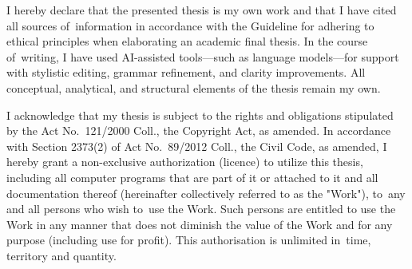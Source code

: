 \documentclass[english,bachelor,twoside]{ctufit-thesis} %
\begin{document}
\cleardoublepage
\begin{declarationpage}
I hereby declare that the presented thesis is my own work and that I have cited all sources of~information in accordance with the Guideline for adhering to ethical principles when elaborating an academic final thesis. 
In the course of~writing, I have used AI-assisted tools—such as language models—for support with stylistic editing, grammar refinement, and clarity improvements. All conceptual, analytical, and structural elements of the thesis remain my own.

I acknowledge that my thesis is subject to the rights and obligations stipulated by the Act No.~121/2000 Coll., the Copyright Act, as amended. In accordance with Section 2373(2) of Act No.~89/2012 Coll., the Civil Code, as amended, I hereby grant a non-exclusive authorization (licence) to utilize this thesis, including all computer programs that are part of it or attached to it and all documentation thereof (hereinafter collectively referred to as the "Work"), to~any and all persons who wish to~use the Work. Such persons are entitled to use the Work in any manner that does not diminish the value of the Work and for any purpose (including use for profit). This authorisation is unlimited in~time, territory and quantity.
\end{declarationpage}

\printabstractpage %

%
%

\tableofcontents %
\end{document}
